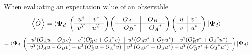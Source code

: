 \documentclass[Master]{subfiles}
\begin{document}
When evaluating an expectation value of an observable
$$
\left<\hat{O}\right> = \bra{\mathbf{\Psi}_d}\left(
\begin{array}{c|c}
   u^{\dag}  &  v^{\dag} \\
   \hline 
   v^{T} &  u^{T}
\end{array}\right) \left(
\begin{array}{c|c}
   {O_A}  &  {O_B} \\
   \hline 
   -{O_B}^* &  -{O_A}^*
\end{array}\right)
\left(
\begin{array}{c|c}
   u  &  v^* \\
   \hline 
   v &  u^*
\end{array}\right)\ket{\mathbf{\Psi}_d}$$
$$
= 
\bra{\mathbf{\Psi}_d}\left(
\begin{array}{c|c}
   u^{\dag}(O_A u+ O_B v) - v^{\dag}(O_B^* u+ {O_A}^* v)
   &
   u^{\dag}(O_A v^*+ O_B u^*) - v^{\dag}(O_B^* v^*+ {O_A}^* u^*) \\
   \hline 
   v^{T}(O_A u+ O_B v) - u^{T}(O_B^* u+ {O_A}^* v) &
   v^{T}(O_A v^*+ O_B u^*) - u^{T}(O_B^* v^*+ {O_A}^* u^*)
\end{array}\right)
\ket{\mathbf{\Psi}_d}
$$
\end{document}
